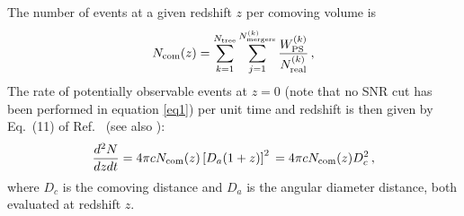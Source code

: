 \documentclass{iopart}
\newcommand{\f}[2]{\frac{#1}{#2}}
\def\be{\begin{equation}}
\def\ee{\end{equation}}
\def\f{\frac}
\begin{document}
%
The number of events at a given redshift $z$ per
comoving volume is
%
\be
N_{\rm com}(z)=
\sum_{k=1}^{N_{\rm tree}}
\sum_{j=1}^{N_{\rm mergers}^{(k)}}
\f{W_{\rm PS}^{(k)}}{N_{\rm real}^{(k)}}\,,
\label{eq1}
\ee
%
The rate of potentially observable events at
$z=0$ (note that no SNR cut has been performed in equation 
\ref{eq1}) 
per unit time and redshift is then given by Eq.~(11) of
Ref.~\cite{Haehnelt:1994wt} (see also \cite{Menou:2001hb}):
%
\be
\f{d^2N}{dzdt}=4\pi c N_{\rm com}(z)
\left[D_a(1+z)\right]^2\,=4\pi c N_{\rm com}(z)
D_c^2\,,
\ee
%
where $D_c$ is the comoving distance and $D_a$ is the angular diameter
distance, both evaluated at redshift $z$. 
\end{document}
